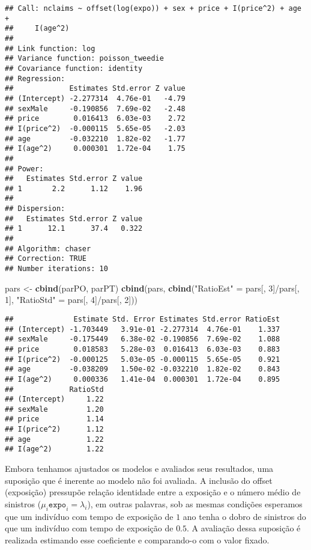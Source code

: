 \documentclass[9pt,a5paper,]{book}
\newenvironment{Shaded}{}{}
\newcommand{\KeywordTok}[1]{\textbf{{#1}}}
\newcommand{\DecValTok}[1]{{#1}}
\newcommand{\StringTok}[1]{{#1}}
\newcommand{\NormalTok}[1]{{#1}}
\renewenvironment{Shaded}{\color{inputcolor}}{}
\theoremstyle{definition}
\theoremstyle{definition}
\theoremstyle{remark}
\begin{document}
\begin{verbatim}
## Call: nclaims ~ offset(log(expo)) + sex + price + I(price^2) + age + 
##     I(age^2)
## 
## Link function: log
## Variance function: poisson_tweedie
## Covariance function: identity
## Regression:
##             Estimates Std.error Z value
## (Intercept) -2.277314  4.76e-01   -4.79
## sexMale     -0.190856  7.69e-02   -2.48
## price        0.016413  6.03e-03    2.72
## I(price^2)  -0.000115  5.65e-05   -2.03
## age         -0.032210  1.82e-02   -1.77
## I(age^2)     0.000301  1.72e-04    1.75
## 
## Power:
##   Estimates Std.error Z value
## 1       2.2      1.12    1.96
## 
## Dispersion:
##   Estimates Std.error Z value
## 1      12.1      37.4   0.322
## 
## Algorithm: chaser
## Correction: TRUE
## Number iterations: 10
\end{verbatim}

\begin{Shaded}
\begin{Highlighting}[]
\NormalTok{pars <-}\StringTok{ }\KeywordTok{cbind}\NormalTok{(parPO, parPT)}
\KeywordTok{cbind}\NormalTok{(pars, }\KeywordTok{cbind}\NormalTok{(}\StringTok{"RatioEst"} \NormalTok{=}\StringTok{ }\NormalTok{pars[, }\DecValTok{3}\NormalTok{]/pars[, }\DecValTok{1}\NormalTok{],}
                  \StringTok{"RatioStd"} \NormalTok{=}\StringTok{ }\NormalTok{pars[, }\DecValTok{4}\NormalTok{]/pars[, }\DecValTok{2}\NormalTok{]))}
\end{Highlighting}
\end{Shaded}

\begin{verbatim}
##              Estimate Std. Error Estimates Std.error RatioEst
## (Intercept) -1.703449   3.91e-01 -2.277314  4.76e-01    1.337
## sexMale     -0.175449   6.38e-02 -0.190856  7.69e-02    1.088
## price        0.018583   5.28e-03  0.016413  6.03e-03    0.883
## I(price^2)  -0.000125   5.03e-05 -0.000115  5.65e-05    0.921
## age         -0.038209   1.50e-02 -0.032210  1.82e-02    0.843
## I(age^2)     0.000336   1.41e-04  0.000301  1.72e-04    0.895
##             RatioStd
## (Intercept)     1.22
## sexMale         1.20
## price           1.14
## I(price^2)      1.12
## age             1.22
## I(age^2)        1.22
\end{verbatim}

Embora tenhamos ajustados os modelos e avaliados seus resultados, uma
suposição que é inerente ao modelo não foi avaliada. A inclusão do
offset (exposição) pressupõe relação identidade entre a exposição e o
número médio de sinistros (\(\mu_i \texttt{expo}_i = \lambda_i\)), em
outras palavras, sob as mesmas condições esperamos que um indivíduo com
tempo de exposição de \(1\) ano tenha o dobro de sinistros do que um
indivíduo com tempo de exposição de \(0.5\). A avaliação dessa suposição
é realizada estimando esse coeficiente e comparando-o com o valor
fixado.
\end{document}
